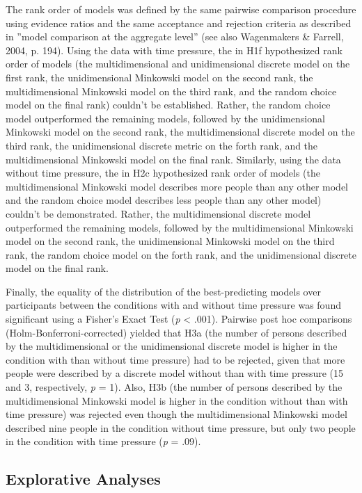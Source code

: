 \documentclass[a4paper,man,natbib]{apa6}
\begin{document}
The rank order of models was defined by the same pairwise comparison procedure using evidence ratios and the same acceptance and rejection criteria as described in ''model comparison at the aggregate level'' (see also Wagenmakers \& Farrell, 2004, p. 194). Using the data with time pressure, the in H1f hypothesized rank order of models (the multidimensional and unidimensional discrete model on the first rank, the unidimensional Minkowski model on the second rank, the multidimensional Minkowski model on the third rank, and the random choice model on the final rank) couldn't be established. Rather, the random choice model outperformed the remaining models, followed by the unidimensional Minkowski model on the second rank, the multidimensional discrete model on the third rank, the unidimensional discrete metric on the forth rank, and the multidimensional Minkowski model on the final rank. Similarly, using the data without time pressure, the in H2c hypothesized rank order of models (the multidimensional Minkowski model describes more people than any other model and the random choice model describes less people than any other model) couldn't be demonstrated. Rather, the multidimensional discrete model outperformed the remaining models, followed by the multidimensional Minkowski model on the second rank, the unidimensional Minkowski model on the third rank, the random choice model on the forth rank, and the unidimensional discrete model on the final rank. 

Finally, the equality of the distribution of the best-predicting models over participants between the conditions with and without time pressure was found significant using a Fisher's Exact Test (\textit{p} < .001). Pairwise post hoc comparisons (Holm-Bonferroni-corrected) yielded that H3a (the number of persons described by the multidimensional or the unidimensional discrete model is higher in the condition with than without time pressure) had to be rejected, given that more people were described by a discrete model without than with time pressure (15 and 3, respectively, \textit{p} = 1). Also, H3b (the number of persons described by the multidimensional Minkowski model is higher in the condition without than with time pressure) was rejected even though the multidimensional Minkowski model described nine people in the condition without time pressure, but only two people in the condition with time pressure (\textit{p} = .09).

\subsection{Explorative Analyses}
\end{document}
